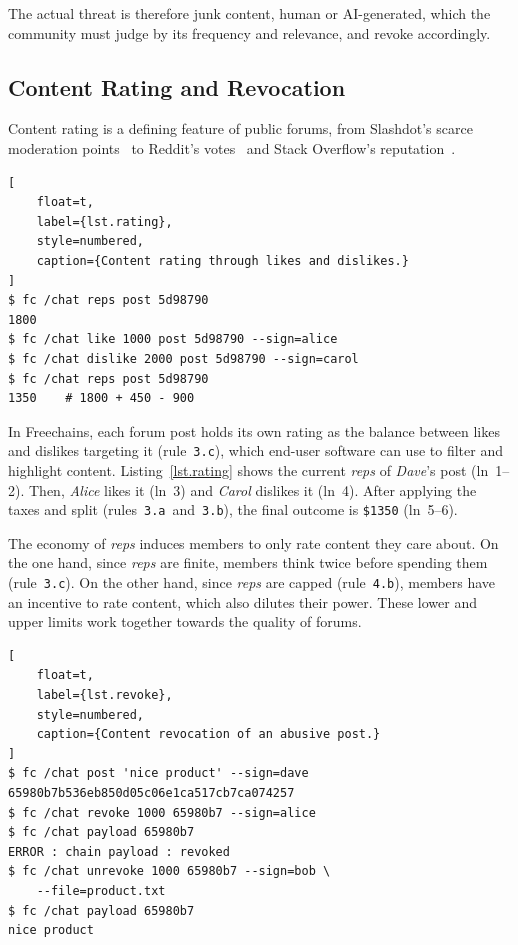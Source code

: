 \documentclass[10pt,twocolumn]{article}
\newcommand{\FC}       {Freechains\xspace}
\newcommand{\R}[1]     {rule~\code{#1}\xspace}
\newcommand{\reps}     {\emph{reps}\xspace}
\newcommand{\nreps}[1] {\code{\$#1\xspace}}
\newcommand{\code}[1]  {\texttt{\small{#1}}}
\begin{document}
The actual threat is therefore junk content, human or AI-generated, which the
community must judge by its frequency and relevance, and revoke accordingly.

\subsection{Content Rating and Revocation}
\label{sec.design.votes}

Content rating is a defining feature of public forums, from Slashdot's scarce
moderation points~\cite{forum.slashdot} to Reddit's votes~\cite{forum.reddit}
and Stack Overflow's reputation~\cite{forum.stackoverflow}.

\begin{lstlisting}[
    float=t,
    label={lst.rating},
    style=numbered,
    caption={Content rating through likes and dislikes.}
]
$ fc /chat reps post 5d98790
1800
$ fc /chat like 1000 post 5d98790 --sign=alice
$ fc /chat dislike 2000 post 5d98790 --sign=carol
$ fc /chat reps post 5d98790
1350    # 1800 + 450 - 900
\end{lstlisting}

In \FC, each forum post holds its own rating as the balance between likes and
dislikes targeting it (\R{3.c}), which end-user software can use to filter and
highlight content.
%
Listing~\ref{lst.rating} shows the current \reps of \emph{Dave}'s post
(ln~1--2).
Then, \emph{Alice} likes it (ln~3) and \emph{Carol} dislikes it (ln~4).
After applying the taxes and split (rules~\code{3.a}~and~\code{3.b}), the final
outcome is \nreps{1350} (ln~5--6).

The economy of \reps induces members to only rate content they care about.
%
On the one hand, since \reps are finite, members think twice before spending
them (\R{3.c}).
On the other hand, since \reps are capped (\R{4.b}), members have an incentive
to rate content, which also dilutes their power.
%
These lower and upper limits work together towards the quality of forums.

\begin{lstlisting}[
    float=t,
    label={lst.revoke},
    style=numbered,
    caption={Content revocation of an abusive post.}
]
$ fc /chat post 'nice product' --sign=dave
65980b7b536eb850d05c06e1ca517cb7ca074257
$ fc /chat revoke 1000 65980b7 --sign=alice
$ fc /chat payload 65980b7
ERROR : chain payload : revoked
$ fc /chat unrevoke 1000 65980b7 --sign=bob \
    --file=product.txt
$ fc /chat payload 65980b7
nice product
\end{lstlisting}
\end{document}
